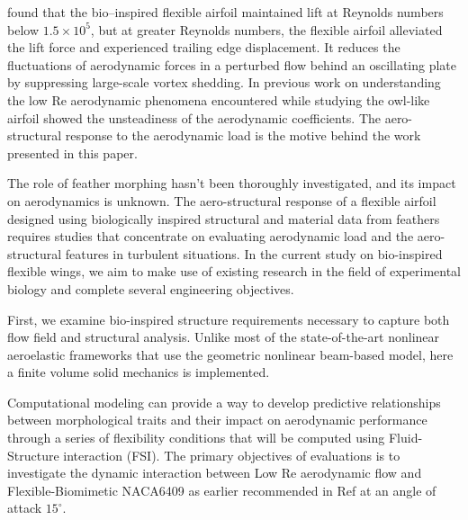 \citet{Gamble2020b} found that the bio--inspired flexible airfoil maintained lift at Reynolds numbers below $1.5\times 10^5$, but at greater Reynolds numbers, the flexible airfoil alleviated the lift force and experienced trailing edge displacement.
%
%
It reduces the fluctuations of aerodynamic forces in a perturbed flow behind an oscillating plate by suppressing large-scale vortex shedding. 
%
In previous work on understanding the low Re aerodynamic phenomena encountered while studying the owl-like airfoil \cite{Boughou2022} showed the unsteadiness of the aerodynamic coefficients.
%
The aero-structural response to the aerodynamic load is the motive behind the work presented in this paper.

The role of feather morphing hasn't been thoroughly investigated, and its impact on aerodynamics is unknown. 
%
The aero-structural response of a flexible airfoil designed using biologically inspired structural and material data from feathers requires studies that concentrate on evaluating aerodynamic load and the aero-structural features in turbulent situations.
%
In the current study on bio-inspired flexible wings, we aim to make use of existing research in the field of experimental biology and complete several engineering objectives. 


First, we examine bio-inspired structure requirements  necessary to capture both flow field and structural analysis. 
%
Unlike most of the state-of-the-art nonlinear aeroelastic frameworks that use the geometric nonlinear beam-based model, here a finite volume solid mechanics is implemented.

Computational modeling can provide a way to develop predictive relationships between morphological traits and their impact on aerodynamic performance through a series of flexibility conditions that will be computed using Fluid-Structure interaction (FSI).
%
The primary objectives of evaluations is to investigate the dynamic interaction between Low Re aerodynamic flow and Flexible-Biomimetic NACA6409 as earlier recommended in Ref \cite{gamble2020b} at an angle of attack $15^{\circ}$.
% 

